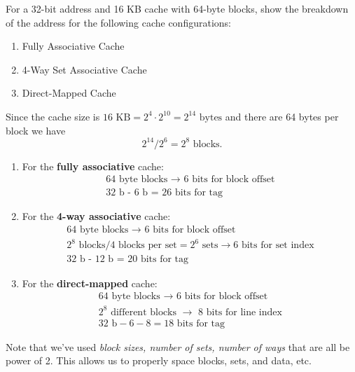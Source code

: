 \begin{problem}
  For a 32-bit address and 16 KB cache with 64-byte blocks, show the breakdown of the address for the following cache configurations:
  \begin{enumerate}[label=\alph*]
    \item Fully Associative Cache
    \item 4-Way Set Associative Cache
    \item Direct-Mapped Cache
  \end{enumerate}
\end{problem}
\begin{answer}
  Since the cache size is \(16 \text{ KB} = 2^4 \cdot 2^{10} = 2^{14} \text{ bytes} \) and there are 64 bytes per block we have
  \[
    2^{14} / 2^6 = 2^8 \text{ blocks}.
  \]
  \begin{enumerate}[label=\alph*]
    \item For the \textbf{fully associative} cache: 
      \begin{align*}
        \text{64 byte blocks \(\to\) 6 bits for block offset} \\
        \text{32 b - 6 b = 26 bits for tag}  
      \end{align*}
    \item For the \textbf{4-way associative} cache: 
      \begin{align*}
        \text{64 byte blocks \(\to\) 6 bits for block offset} \\
        \text{\(2^8\) blocks} / \text{4 blocks per set} = 2^6 \text{ sets} \to 6 \text{ bits for set index}  \\
        \text{32 b - 12 b = 20 bits for tag}  
      \end{align*}
    \item For the \textbf{direct-mapped} cache: 
      \begin{align*}
        \text{64 byte blocks \(\to\) 6 bits for block offset} \\
        \text{\(2^8\) different blocks \(\to\) 8 bits for line index} \\
        32 \text{ b} - 6 - 8 = 18 \text{ bits for tag} 
      \end{align*}
  \end{enumerate}
\end{answer}

\begin{remark}
  Note that we've used \emph{block sizes, number of sets, number of ways} that are all be power of 2. This allows us to properly space blocks, sets, and data, etc.
\end{remark}

